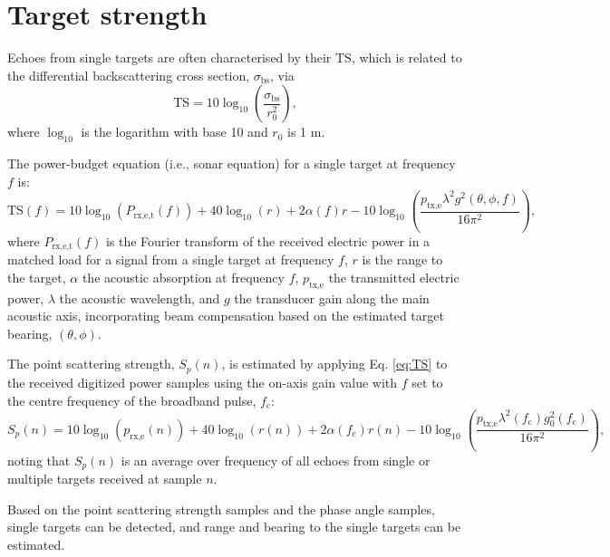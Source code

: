 \documentclass[preprint,12pt,TurnOnLineNumbers]{JASAnew}
\newcommand{\freqsym}{f}
\newcommand{\samplesymt}{n}
\newcommand{\fc}{f_{\textrm{c}}}
\newcommand{\ptxe}{p_{\textrm{tx,e}}}
\newcommand{\prxe}{p_{\textrm{rx,e}}}
\newcommand{\prxetf}{P_{\textrm{rx,e,t}}}
\newcommand{\bs}{\sigma_{\textrm{bs}}}
\newcommand{\mysp}{S_p}
\newcommand{\ts}{\textrm{TS}}
\newcommand{\range}{r}
\newcommand{\rangeref}{r_0}
\newcommand{\athw}{\phi}
\newcommand{\along}{\theta}
\newcommand{\gain}{g}
\newcommand{\gainzero}{g_0}
\newcommand{\wlen}{\lambda}
\newcommand{\absorp}{\alpha}
\begin{document}
\section{Target strength}

Echoes from single targets are often characterised by their $\ts$, which is related to the differential backscattering cross section, $\bs$, via
%
\begin{equation}
\label{eq:TS_bs}
\ts = 10\log_{10}\left(\frac{\bs}{\rangeref^2}\right),
\end{equation}
%
where $\log_{10}$ is the logarithm with base 10 and $\rangeref$ is 1 m.

The power-budget equation (i.e., sonar equation) for a single target \citep[Formulation D, ][]{lunde2016} at frequency $\freqsym$ is:
%
\begin{equation}
\label{eq:TS}
\ts(\freqsym) = 10\log_{10}(\prxetf(\freqsym)) + 40\log_{10}(\range) + 2\absorp(\freqsym) \range 
- 10\log_{10}\left( \frac{\ptxe \wlen^2 \gain^2(\along,\athw,\freqsym)}{16\pi^2} \right),
\end{equation}
%
where $\prxetf(\freqsym)$ is the Fourier transform of the received electric power in a matched load for a signal from a single target at frequency $\freqsym$, $\range$ is the range to the target, $\absorp$ the acoustic absorption at frequency $f$, $\ptxe$ the transmitted electric power, $\wlen$ the acoustic wavelength, and $\gain$ the transducer gain along the main acoustic axis, incorporating beam compensation based on the estimated target bearing, $(\along,\athw)$.

The point scattering strength, $\mysp(\samplesymt)$, is estimated by applying Eq. \ref{eq:TS} to the received digitized power samples using the on-axis gain value with $f$ set to the centre frequency of the broadband pulse, $\fc$: 
\begin{equation}
\label{eq:Sp}
\mysp(\samplesymt) = 10\log_{10}(\prxe(\samplesymt)) + 40\log_{10}(\range(\samplesymt)) 
+ 2\absorp(\fc) \range(\samplesymt) - 10\log_{10}\left( \frac{\ptxe \wlen^2(\fc) \gainzero^2(\fc)}{16\pi^2} \right),
\end{equation}
%
noting that $\mysp(\samplesymt)$ is an average over frequency of all echoes from single or multiple targets received at sample $\samplesymt$.

Based on the point scattering strength samples and the phase angle samples, single targets can be detected, and range and bearing to the single targets can be estimated.
\end{document}
